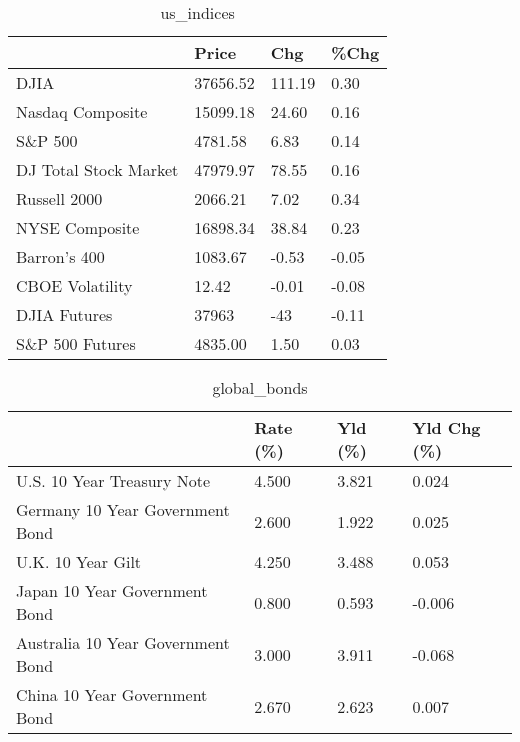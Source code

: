 \documentclass{article}%
\begin{document}
%


\begin{table}[htbp]%
\caption{us\_indices}%
\centering%
\begin{adjustbox}{width=1\textwidth}%
\begin{tabular}{llll}
\toprule
                      &    Price &    Chg &  \%Chg \\
\midrule
                 DJIA & 37656.52 & 111.19 &  0.30 \\
     Nasdaq Composite & 15099.18 &  24.60 &  0.16 \\
              S\&P 500 &  4781.58 &   6.83 &  0.14 \\
DJ Total Stock Market & 47979.97 &  78.55 &  0.16 \\
         Russell 2000 &  2066.21 &   7.02 &  0.34 \\
       NYSE Composite & 16898.34 &  38.84 &  0.23 \\
         Barron's 400 &  1083.67 &  -0.53 & -0.05 \\
      CBOE Volatility &    12.42 &  -0.01 & -0.08 \\
         DJIA Futures &    37963 &    -43 & -0.11 \\
      S\&P 500 Futures &  4835.00 &   1.50 &  0.03 \\
\bottomrule
\end{tabular}
%
\end{adjustbox}%
\end{table}

%


\begin{table}[htbp]%
\caption{global\_bonds}%
\centering%
\begin{adjustbox}{width=1\textwidth}%
\begin{tabular}{llll}
\toprule
                                  & Rate (\%) & Yld (\%) & Yld Chg (\%) \\
\midrule
       U.S. 10 Year Treasury Note &    4.500 &   3.821 &       0.024 \\
  Germany 10 Year Government Bond &    2.600 &   1.922 &       0.025 \\
                U.K. 10 Year Gilt &    4.250 &   3.488 &       0.053 \\
    Japan 10 Year Government Bond &    0.800 &   0.593 &      -0.006 \\
Australia 10 Year Government Bond &    3.000 &   3.911 &      -0.068 \\
    China 10 Year Government Bond &    2.670 &   2.623 &       0.007 \\
\bottomrule
\end{tabular}
%
\end{adjustbox}%
\end{table}
\end{document}

